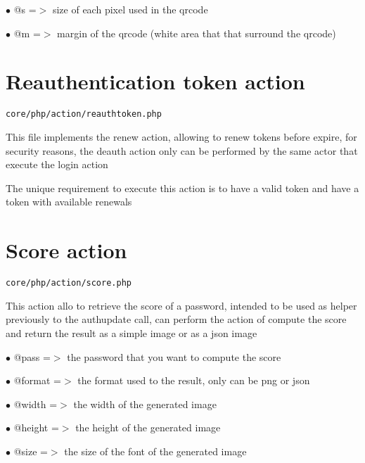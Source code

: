 \documentclass[a4paper]{book}
\begin{document}
\begin{compactitem}
\item[\color{myblue}$\bullet$] @s =$>$ size of each pixel used in the qrcode
\item[\color{myblue}$\bullet$] @m =$>$ margin of the qrcode (white area that that surround the qrcode)
\end{compactitem}

\hypertarget{toc15}{}
\section{Reauthentication token action}

\begin{lstlisting}
core/php/action/reauthtoken.php
\end{lstlisting}

This file implements the renew action, allowing to renew tokens before
expire, for security reasons, the deauth action only can be performed by
the same actor that execute the login action

The unique requirement to execute this action is to have a valid token
and have a token with available renewals

\hypertarget{toc16}{}
\section{Score action}

\begin{lstlisting}
core/php/action/score.php
\end{lstlisting}

This action allo to retrieve the score of a password, intended to be used
as helper previously to the authupdate call, can perform the action of
compute the score and return the result as a simple image or as a json
image

\begin{compactitem}
\item[\color{myblue}$\bullet$] @pass   =$>$ the password that you want to compute the score
\item[\color{myblue}$\bullet$] @format =$>$ the format used to the result, only can be png or json
\end{compactitem}

\begin{compactitem}
\item[\color{myblue}$\bullet$] @width  =$>$ the width of the generated image
\item[\color{myblue}$\bullet$] @height =$>$ the height of the generated image
\item[\color{myblue}$\bullet$] @size   =$>$ the size of the font of the generated image
\end{compactitem}
\end{document}
